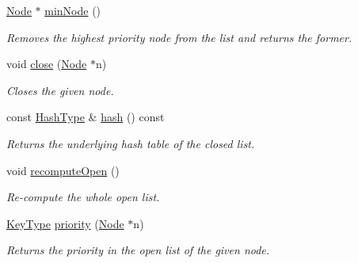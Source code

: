 \begin{DoxyCompactItemize}
\hyperlink{structOpenClosedList_ad537fb81d3482e41e8ad0ee9288819c9}{Node} $\ast$ \hyperlink{structOpenClosedList_a9d3eaa882373c24c2456f065d22b7127}{min\+Node} ()
\begin{DoxyCompactList}\small\item\em Removes the highest priority node from the list and returns the former. \end{DoxyCompactList}\item 
void \hyperlink{structOpenClosedList_af256fcb1fc5a754ece48f767a1831175}{close} (\hyperlink{structOpenClosedList_ad537fb81d3482e41e8ad0ee9288819c9}{Node} $\ast$n)
\begin{DoxyCompactList}\small\item\em Closes the given node. \end{DoxyCompactList}\item 
const \hyperlink{structOpenClosedList_a4d6714df3a19f272fef2f0ca7fb7a1b7}{Hash\+Type} \& \hyperlink{structOpenClosedList_af8818a287f3d2f12dbe857ba356debff}{hash} () const 
\begin{DoxyCompactList}\small\item\em Returns the underlying hash table of the closed list. \end{DoxyCompactList}\item 
void \hyperlink{structOpenClosedList_a2a827bb7b283a1adfafd8720727ad7c4}{recompute\+Open} ()\hypertarget{structOpenClosedList_a2a827bb7b283a1adfafd8720727ad7c4}{}\label{structOpenClosedList_a2a827bb7b283a1adfafd8720727ad7c4}

\begin{DoxyCompactList}\small\item\em Re-\/compute the whole open list. \end{DoxyCompactList}\item 
\hyperlink{structOpenClosedList_a396ae2c0d03cce359af0d6fd314f663c}{Key\+Type} \hyperlink{structOpenClosedList_ad3f45ec198293d09255a291e5cbff4a7}{priority} (\hyperlink{structOpenClosedList_ad537fb81d3482e41e8ad0ee9288819c9}{Node} $\ast$n)
\begin{DoxyCompactList}\small\item\em Returns the priority in the open list of the given node. \end{DoxyCompactList}\end{DoxyCompactItemize}
